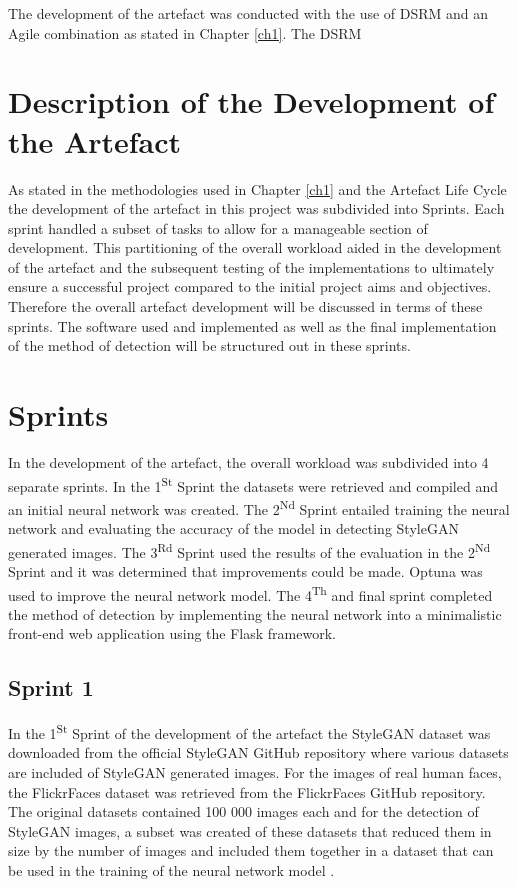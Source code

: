 The development of the artefact was conducted with the use of DSRM and an Agile combination as stated in  Chapter \ref{ch1}. The DSRM  

\section{Description of the Development of the Artefact}

As stated in the methodologies used in Chapter \ref{ch1} and the Artefact Life Cycle the development of the artefact in this project was subdivided into Sprints. Each sprint handled a subset of tasks to allow for a manageable section of development. This partitioning of the overall workload aided in the development of the artefact and the subsequent testing of the implementations to ultimately ensure a successful project compared to the initial project aims and objectives. Therefore the overall artefact development will be discussed in terms of these sprints. The software used and implemented as well as the final implementation of the method of detection will be structured out in these sprints. 

\section{Sprints}

In the development of the artefact, the overall workload was subdivided into 4 separate sprints. In the 1\textsuperscript{St} Sprint the datasets were retrieved and compiled and an initial neural network was created. The 2\textsuperscript{Nd} Sprint entailed training the neural network and evaluating the accuracy of the model in detecting StyleGAN generated images. The 3\textsuperscript{Rd} Sprint used the results of the evaluation in the 2\textsuperscript{Nd} Sprint and it was determined that improvements could be made. Optuna was used to improve the neural network model. The 4\textsuperscript{Th} and final sprint completed the method of detection by implementing the neural network into a minimalistic front-end web application using the Flask framework.

\subsection{Sprint 1}

In the 1\textsuperscript{St} Sprint of the development of the artefact the StyleGAN dataset was downloaded from the official StyleGAN GitHub repository where various datasets are included of StyleGAN generated images. For the images of real human faces, the FlickrFaces dataset was retrieved from the FlickrFaces GitHub repository. The original datasets contained 100 000 images each and for the detection of StyleGAN images, a subset was created of these datasets that reduced them in size by the number of images and included them together in a dataset that can be used in the training of the neural network model \citep{Karras2019}.


